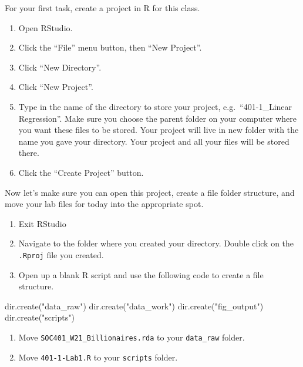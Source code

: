 \documentclass[
]{book}
\newenvironment{Shaded}{\begin{snugshade}}{\end{snugshade}}
\newcommand{\FunctionTok}[1]{\textcolor[rgb]{0.00,0.00,0.00}{#1}}
\newcommand{\NormalTok}[1]{#1}
\newcommand{\StringTok}[1]{\textcolor[rgb]{0.31,0.60,0.02}{#1}}
\providecommand{\tightlist}{%
  \setlength{\itemsep}{0pt}\setlength{\parskip}{0pt}}
\begin{document}
For your first task, create a project in R for this class.

\begin{enumerate}
\def\labelenumi{\arabic{enumi}.}
\tightlist
\item
  Open RStudio.
\item
  Click the ``File'' menu button, then ``New Project''.
\item
  Click ``New Directory''.
\item
  Click ``New Project''.
\item
  Type in the name of the directory to store your project, e.g.~``401-1\_Linear Regression''. Make sure you choose the parent folder on your computer where you want these files to be stored. Your project will live in new folder with the name you gave your directory. Your project and all your files will be stored there.
\item
  Click the ``Create Project'' button.
\end{enumerate}

Now let's make sure you can open this project, create a file folder structure, and move your lab files for today into the appropriate spot.

\begin{enumerate}
\def\labelenumi{\arabic{enumi}.}
\tightlist
\item
  Exit RStudio
\item
  Navigate to the folder where you created your directory. Double click on the \texttt{.Rproj} file you created.\\
\item
  Open up a blank R script and use the following code to create a file structure.
\end{enumerate}

\begin{Shaded}
\begin{Highlighting}[]
\FunctionTok{dir.create}\NormalTok{(}\StringTok{"data\_raw"}\NormalTok{)}
\FunctionTok{dir.create}\NormalTok{(}\StringTok{"data\_work"}\NormalTok{)}
\FunctionTok{dir.create}\NormalTok{(}\StringTok{"fig\_output"}\NormalTok{)}
\FunctionTok{dir.create}\NormalTok{(}\StringTok{"scripts"}\NormalTok{)}
\end{Highlighting}
\end{Shaded}

\begin{enumerate}
\def\labelenumi{\arabic{enumi}.}
\setcounter{enumi}{3}
\tightlist
\item
  Move \texttt{SOC401\_W21\_Billionaires.rda} to your \texttt{data\_raw} folder.
\item
  Move \texttt{401-1-Lab1.R} to your \texttt{scripts} folder.
\end{enumerate}
\end{document}
